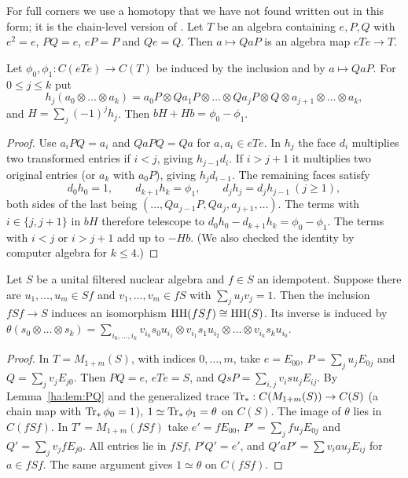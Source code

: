 For full corners we use a homotopy that we have not found written out in
this form; it is the chain-level version of \cite[\S1.2]{Loday}. Let
\(T\) be an algebra containing \(e,P,Q\) with \(e^2=e\), \(PQ=e\),
\(eP=P\) and \(Qe=Q\). Then \(a\mapsto QaP\) is an algebra map
\(eTe\to T\).

\begin{lemma}\label{ha:lem:PQ}
Let \(\phi_0,\phi_1:C(eTe)\to C(T)\) be induced by the inclusion and by
\(a\mapsto QaP\). For \(0\le j\le k\) put
\[
 h_j(a_0\otimes\dots\otimes a_k)=a_0P\otimes Qa_1P\otimes\dots\otimes
 Qa_jP\otimes Q\otimes a_{j+1}\otimes\dots\otimes a_k,
\]
and \(H=\sum_j(-1)^jh_j\). Then \(bH+Hb=\phi_0-\phi_1\).
\end{lemma}

\begin{proof}
Use \(a_iPQ=a_i\) and \(QaPQ=Qa\) for \(a,a_i\in eTe\). In \(h_j\) the
face \(d_i\) multiplies two transformed entries if \(i<j\), giving
\(h_{j-1}d_i\). If \(i>j+1\) it multiplies two original entries (or
\(a_k\) with \(a_0P\)), giving \(h_jd_{i-1}\). The remaining faces satisfy
\[
 d_0h_0=1,\qquad d_{k+1}h_k=\phi_1,\qquad d_jh_j=d_jh_{j-1}\ (j\ge1),
\]
both sides of the last being \((\dots,Qa_{j-1}P,Qa_j,a_{j+1},\dots)\). The
terms with \(i\in\{j,j+1\}\) in \(bH\) therefore telescope to
\(d_0h_0-d_{k+1}h_k=\phi_0-\phi_1\). The terms with \(i<j\) or \(i>j+1\)
add up to \(-Hb\). (We also checked the identity by computer algebra for
\(k\le4\).)
\end{proof}

\begin{proposition}\label{ha:prop:corner}
Let \(S\) be a unital filtered nuclear algebra and \(f\in S\) an
idempotent. Suppose there are \(u_1,\dots,u_m\in Sf\) and
\(v_1,\dots,v_m\in fS\) with \(\sum_ju_jv_j=1\). Then the inclusion
\(fSf\to S\) induces an isomorphism \(\operatorname{HH}(fSf)\cong\operatorname{HH}(S)\). Its inverse
is induced by
\(\theta(s_0\otimes\dots\otimes s_k)=\sum_{i_0,\dots,i_k}v_{i_0}s_0u_{i_1}
\otimes v_{i_1}s_1u_{i_2}\otimes\dots\otimes v_{i_k}s_ku_{i_0}\).
\end{proposition}

\begin{proof}
In \(T=M_{1+m}(S)\), with indices \(0,\dots,m\), take \(e=E_{00}\),
\(P=\sum_ju_jE_{0j}\) and \(Q=\sum_jv_jE_{j0}\). Then \(PQ=e\), \(eTe=S\),
and \(QsP=\sum_{i,j}v_isu_jE_{ij}\). By Lemma~\ref{ha:lem:PQ} and the
generalized trace \(\operatorname{Tr}_*:C(M_{1+m}(S))\to C(S)\) (a chain map with
\(\operatorname{Tr}_*\phi_0=1\)), \(1\simeq\operatorname{Tr}_*\phi_1=\theta\) on \(C(S)\). The image of
\(\theta\) lies in \(C(fSf)\). In \(T'=M_{1+m}(fSf)\) take \(e'=fE_{00}\),
\(P'=\sum_jfu_jE_{0j}\) and \(Q'=\sum_jv_jfE_{j0}\). All entries lie in
\(fSf\), \(P'Q'=e'\), and \(Q'aP'=\sum v_iau_jE_{ij}\) for \(a\in fSf\).
The same argument gives \(1\simeq\theta\) on \(C(fSf)\).
\end{proof}

